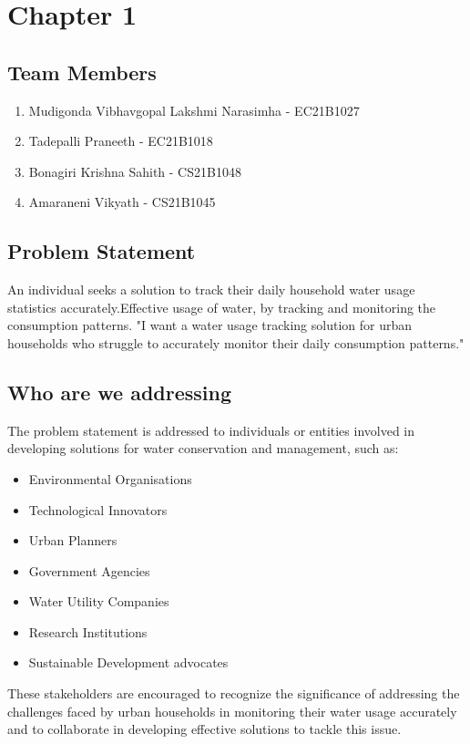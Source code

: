 \chapter{Chapter 1}
\graphicspath{{Chapter1/}}
\section{Team Members}
\begin{enumerate}
	\item Mudigonda Vibhavgopal Lakshmi Narasimha - EC21B1027
	\item Tadepalli Praneeth - EC21B1018
	\item Bonagiri Krishna Sahith - CS21B1048
	\item Amaraneni Vikyath -  CS21B1045
\end{enumerate}
\section{Problem Statement}
An individual seeks a solution to track their daily household water usage statistics accurately.Effective usage of water, by tracking and monitoring the consumption patterns.
"I want a water usage tracking solution for urban households who struggle to accurately monitor their daily consumption patterns."


\section{Who are we addressing}
The problem statement is addressed to individuals or entities involved in developing solutions for water conservation and management, such as:
\begin{itemize}

	\item Environmental Organisations
	\item Technological Innovators
	\item Urban Planners
	\item Government Agencies
	\item Water Utility Companies
	\item Research Institutions
	\item Sustainable Development advocates


\end{itemize}
These stakeholders are encouraged to recognize the significance of addressing the challenges faced by urban households in monitoring their water usage accurately and to collaborate in developing effective solutions to tackle this issue.

